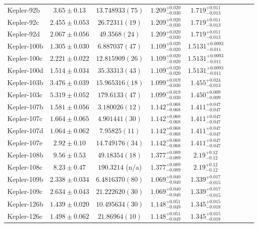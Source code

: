 \documentclass[a4paper,fleqn,usenatbib]{mnras}
\begin{document}
\begin{table*}
\begin{tabular}{lcccccccc}
Kepler-92b& 	$3.65 \pm 0.13$	   &$13.748933 (75)$	&$1.209_{-0.030}^{+0.020}$	&$1.719_{-0.013}^{+0.011}$		\\
Kepler-92c& 	$2.455 \pm 0.053$	&$26.72311 (19)$	&$1.209_{-0.030}^{+0.020}$	&$1.719_{-0.013}^{+0.011}$		\\
Kepler-92d& 	$2.067 \pm 0.056$	&$49.3568 (24)$		&$1.209_{-0.030}^{+0.020}$	&$1.719_{-0.013}^{+0.011}$		\\
Kepler-100b&	$1.305 \pm 0.030$	&$6.887037 (47)$	&$1.109_{-0.020}^{+0.020}$	&$1.5131_{-0.011}^{+0.0093}$		\\
Kepler-100c&	$2.221 \pm 0.022$	&$12.815909 (26)$	&$1.109_{-0.020}^{+0.020}$	&$1.5131_{-0.011}^{+0.0093}$		\\
Kepler-100d&	$1.514 \pm 0.034$	&$35.33313 (43)$	&$1.109_{-0.020}^{+0.020}$	&$1.5131_{-0.011}^{+0.0093}$	\\
Kepler-103b&	$3.476 \pm 0.039$	&$15.965316 (18)$	&$1.099_{-0.030}^{+0.019}$	&$1.455_{-0.013}^{+0.024}$		\\
Kepler-103c&	$5.319 \pm 0.052$	&$179.6133 (47)$	&$1.099_{-0.030}^{+0.019}$	&$1.450_{-0.009}^{+0.009}$		\\
Kepler-107b&	$1.581 \pm 0.056$	&$3.180026 (12)$	&$1.142_{-0.068}^{+0.068}$	&$1.411_{-0.047}^{+0.047}$\\
Kepler-107c&	$1.664 \pm 0.065$	&$4.901441 (30)$	&$1.142_{-0.068}^{+0.068}$	&$1.411_{-0.047}^{+0.047}$\\
Kepler-107d&	$1.064 \pm 0.062$	&$7.95825 (11)$		&$1.142_{-0.068}^{+0.068}$	&$1.411_{-0.047}^{+0.047}$	\\
Kepler-107e&	$2.92 \pm 0.10$	   &$14.749176 (34)$	&$1.142_{-0.068}^{+0.068}$	&$1.411_{-0.047}^{+0.047}$	\\
Kepler-108b&	$9.56 \pm 0.53$	   &$49.18354 (18)$	    &$1.377_{-0.089}^{+0.089}$	&$2.19_{-0.12}^{+0.12}$		\\
Kepler-108c&	$8.23 \pm 0.47$    	&$190.3214$ (n/a)	&$1.377_{-0.089}^{+0.089}$	&$2.19_{-0.12}^{+0.12}$		\\
Kepler-109b&	$2.338 \pm 0.034$	&$6.4816370 (80)$	&$1.069_{-0.040}^{+0.040}$	&$1.339_{-0.015}^{+0.017}$		\\
Kepler-109c&	$2.634 \pm 0.043$	&$21.222620 (30)$	&$1.069_{-0.040}^{+0.040}$	&$1.339_{-0.015}^{+0.017}$		\\
Kepler-126b&	$1.439 \pm 0.020$	&$10.495634 (30)$	&$1.148_{-0.049}^{+0.051}$	&$1.345_{-0.018}^{+0.015}$	\\
Kepler-126c&	$1.498 \pm 0.062$	&$21.86964 (10)$	&$1.148_{-0.049}^{+0.051}$	&$1.345_{-0.018}^{+0.015}$	\\

\end{tabular}
\end{table*}
\end{document}
